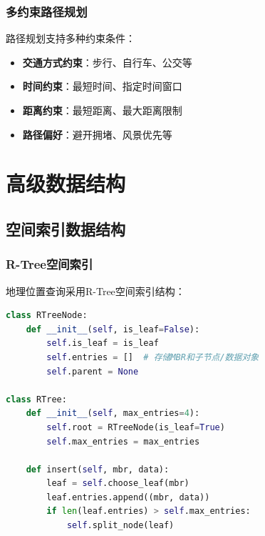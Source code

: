 \documentclass[12pt,a4paper]{article}
\begin{document}
\subsubsection{多约束路径规划}
路径规划支持多种约束条件：
\begin{itemize}
    \item \textbf{交通方式约束}：步行、自行车、公交等
    \item \textbf{时间约束}：最短时间、指定时间窗口
    \item \textbf{距离约束}：最短距离、最大距离限制
    \item \textbf{路径偏好}：避开拥堵、风景优先等
\end{itemize}

\section{高级数据结构}

\subsection{空间索引数据结构}

\subsubsection{R-Tree空间索引}
地理位置查询采用R-Tree空间索引结构：

\begin{lstlisting}[language=python, caption={R-Tree空间索引实现}]
class RTreeNode:
    def __init__(self, is_leaf=False):
        self.is_leaf = is_leaf
        self.entries = []  # 存储MBR和子节点/数据对象
        self.parent = None
        
class RTree:
    def __init__(self, max_entries=4):
        self.root = RTreeNode(is_leaf=True)
        self.max_entries = max_entries
        
    def insert(self, mbr, data):
        leaf = self.choose_leaf(mbr)
        leaf.entries.append((mbr, data))
        if len(leaf.entries) > self.max_entries:
            self.split_node(leaf)
\end{lstlisting}
\end{document}
